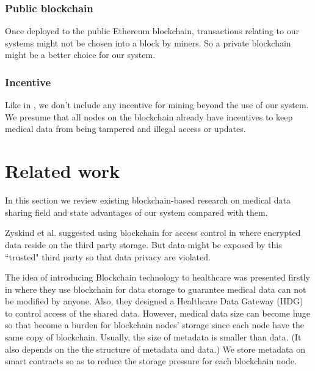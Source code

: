 \documentclass[conference]{IEEEtran}
\begin{document}
\subsubsection{Public blockchain}
Once deployed to the public Ethereum blockchain, transactions relating to our systems might not be chosen into a block by miners. So a private blockchain might be a better choice for our system.

\subsubsection{Incentive}
Like in \cite{dagher2018ancile}, we don't include any incentive for mining beyond the use of our system. We presume that all nodes on the blockchain already have incentives to keep medical data from being tampered and illegal access or updates.

\section{Related work}
\label{related work}
In this section we review existing blockchain-based research on medical data sharing field and state advantages of our system compared with them.

Zyskind et al. suggested using blockchain for access control in \cite{zyskind2015decentralizing} where encrypted data reside on the third party storage. But data might be exposed by this ``trusted" third party so that data privacy are violated.

The idea of introducing Blockchain technology to healthcare was presented firstly in \cite{yue2016healthcare} where they use blockchain for data storage to guarantee medical data can not be modified by anyone. Also, they designed a Healthcare Data Gateway (HDG) to control access of the shared data. However, medical data size can become huge so that become a burden for blockchain nodes' storage since each node have the same copy of blockchain. Usually, the size of metadata is smaller than data. (It also depends on the the structure of metadata and data.) We store metadata on smart contracts so as to reduce the storage pressure for each blockchain node.
\end{document}
